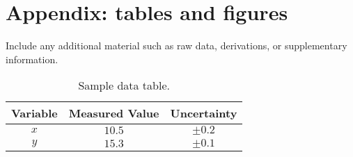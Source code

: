 \documentclass[a4paper,12pt]{article}
\begin{document}
\printbibliography %

\newpage
\appendix
\section{Appendix: tables and figures}
\label{sec:appendix}
Include any additional material such as raw data, derivations, or supplementary information.

\begin{table}[H]
    \centering
    \begin{tabular}{|c|c|c|}
        \hline
        Variable & Measured Value & Uncertainty \\ 
        \hline
        $x$ & $10.5$ & $\pm0.2$ \\ 
        $y$ & $15.3$ & $\pm0.1$ \\ 
        \hline
    \end{tabular}
    \caption{Sample data table.}
    \label{tab:example_table}
\end{table}
\end{document}
